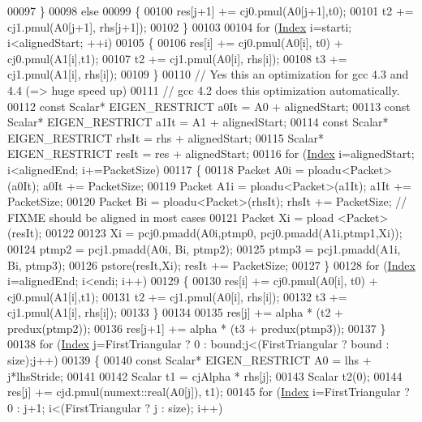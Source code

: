 \begin{DoxyCode}
00097     \}
00098     \textcolor{keywordflow}{else}
00099     \{
00100       res[j+1] += cj0.pmul(A0[j+1],t0);
00101       t2 += cj1.pmul(A0[j+1], rhs[j+1]);
00102     \}
00103 
00104     \textcolor{keywordflow}{for} (\hyperlink{namespace_eigen_a62e77e0933482dafde8fe197d9a2cfde}{Index} i=starti; i<alignedStart; ++i)
00105     \{
00106       res[i] += cj0.pmul(A0[i], t0) + cj0.pmul(A1[i],t1);
00107       t2 += cj1.pmul(A0[i], rhs[i]);
00108       t3 += cj1.pmul(A1[i], rhs[i]);
00109     \}
00110     \textcolor{comment}{// Yes this an optimization for gcc 4.3 and 4.4 (=> huge speed up)}
00111     \textcolor{comment}{// gcc 4.2 does this optimization automatically.}
00112     \textcolor{keyword}{const} Scalar* EIGEN\_RESTRICT a0It  = A0  + alignedStart;
00113     \textcolor{keyword}{const} Scalar* EIGEN\_RESTRICT a1It  = A1  + alignedStart;
00114     \textcolor{keyword}{const} Scalar* EIGEN\_RESTRICT rhsIt = rhs + alignedStart;
00115           Scalar* EIGEN\_RESTRICT resIt = res + alignedStart;
00116     \textcolor{keywordflow}{for} (\hyperlink{namespace_eigen_a62e77e0933482dafde8fe197d9a2cfde}{Index} i=alignedStart; i<alignedEnd; i+=PacketSize)
00117     \{
00118       Packet A0i = ploadu<Packet>(a0It);  a0It  += PacketSize;
00119       Packet A1i = ploadu<Packet>(a1It);  a1It  += PacketSize;
00120       Packet Bi  = ploadu<Packet>(rhsIt); rhsIt += PacketSize; \textcolor{comment}{// FIXME should be aligned in most cases}
00121       Packet Xi  = pload <Packet>(resIt);
00122 
00123       Xi    = pcj0.pmadd(A0i,ptmp0, pcj0.pmadd(A1i,ptmp1,Xi));
00124       ptmp2 = pcj1.pmadd(A0i,  Bi, ptmp2);
00125       ptmp3 = pcj1.pmadd(A1i,  Bi, ptmp3);
00126       pstore(resIt,Xi); resIt += PacketSize;
00127     \}
00128     \textcolor{keywordflow}{for} (\hyperlink{namespace_eigen_a62e77e0933482dafde8fe197d9a2cfde}{Index} i=alignedEnd; i<endi; i++)
00129     \{
00130       res[i] += cj0.pmul(A0[i], t0) + cj0.pmul(A1[i],t1);
00131       t2 += cj1.pmul(A0[i], rhs[i]);
00132       t3 += cj1.pmul(A1[i], rhs[i]);
00133     \}
00134 
00135     res[j]   += alpha * (t2 + predux(ptmp2));
00136     res[j+1] += alpha * (t3 + predux(ptmp3));
00137   \}
00138   \textcolor{keywordflow}{for} (\hyperlink{namespace_eigen_a62e77e0933482dafde8fe197d9a2cfde}{Index} j=FirstTriangular ? 0 : bound;j<(FirstTriangular ? bound : size);j++)
00139   \{
00140     \textcolor{keyword}{const} Scalar* EIGEN\_RESTRICT A0 = lhs + j*lhsStride;
00141 
00142     Scalar t1 = cjAlpha * rhs[j];
00143     Scalar t2(0);
00144     res[j] += cjd.pmul(numext::real(A0[j]), t1);
00145     \textcolor{keywordflow}{for} (\hyperlink{namespace_eigen_a62e77e0933482dafde8fe197d9a2cfde}{Index} i=FirstTriangular ? 0 : j+1; i<(FirstTriangular ? j : size); i++)

\end{DoxyCode}
